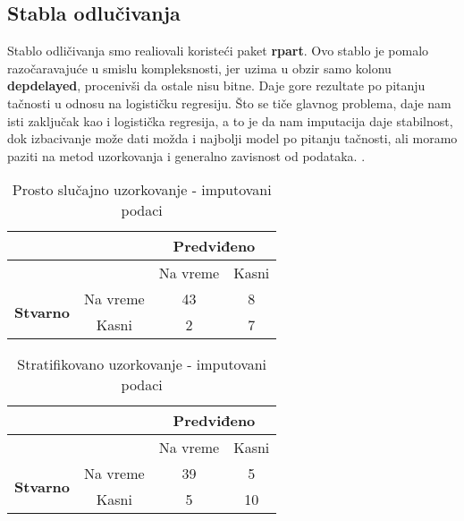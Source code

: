 \documentclass{article}
\begin{document}
\subsection*{Stabla odlučivanja}

Stablo odličivanja smo realiovali koristeći paket \textbf{rpart}. Ovo stablo je pomalo razočaravajuće u smislu kompleksnosti, jer uzima u obzir samo kolonu \textbf{depdelayed}, procenivši da ostale nisu bitne. Daje gore rezultate po pitanju tačnosti u odnosu na logističku regresiju. Što se tiče glavnog problema, daje nam isti zaključak kao i logistička regresija, a to je da nam imputacija daje stabilnost, dok izbacivanje može dati možda i najbolji model po pitanju tačnosti, ali moramo paziti na metod uzorkovanja i generalno zavisnost od podataka. \cite{githubrepo}.

\begin{table}[H]
    \centering
    \begin{tabular}{|c|c|c|c|}
        \hline
        \multicolumn{2}{|c|}{} & \multicolumn{2}{c|}{\textbf{Predviđeno}} \\
        \hline
        \multicolumn{2}{|c|}{} & Na vreme & Kasni \\
        \hline
        \multirow{2}{*}{\textbf{Stvarno}} & Na vreme & 43 & 8 \\
        \cline{2-4}
         & Kasni & 2 & 7 \\
        \hline
    \end{tabular}
    \caption{Prosto slučajno uzorkovanje - imputovani podaci}
    \label{table:confusion_matrix5}
\end{table}

\begin{table}[H]
    \centering
    \begin{tabular}{|c|c|c|c|}
        \hline
        \multicolumn{2}{|c|}{} & \multicolumn{2}{c|}{\textbf{Predviđeno}} \\
        \hline
        \multicolumn{2}{|c|}{} & Na vreme & Kasni \\
        \hline
        \multirow{2}{*}{\textbf{Stvarno}} & Na vreme & 39 & 5 \\
        \cline{2-4}
         & Kasni & 5 & 10 \\
        \hline
    \end{tabular}
    \caption{Stratifikovano uzorkovanje - imputovani podaci}
    \label{table:confusion_matrix6}
\end{table}
\end{document}
